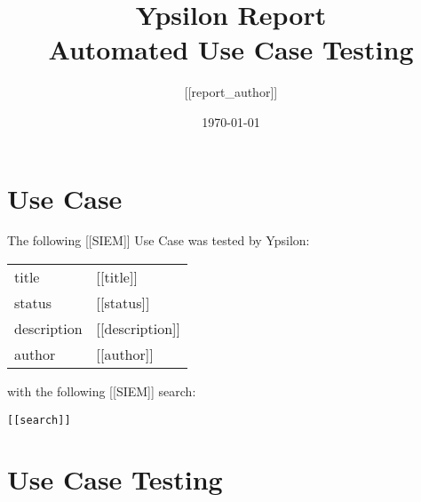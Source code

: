 \documentclass{article}
\title{Ypsilon Report \\ Automated Use Case Testing} %
\author{[[report_author]]} %
\date{\today} %
\begin{document}
\maketitle %


\section{Use Case}

The following [[SIEM]] Use Case was tested by Ypsilon:

\begin{center}
\begin{tabularx}{\textwidth}{ l X }
title & [[title]] \\
status & [[status]] \\
description & [[description]] \\
author & [[author]] 
\end{tabularx}
\end{center}

with the following [[SIEM]] search:

\begin{lstlisting}[frame=single]
[[search]]
\end{lstlisting}

\section{Use Case Testing}

\end{document}
